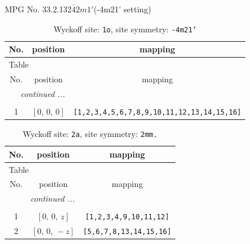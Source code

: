 \documentclass[fleqn,8pt]{jsarticle}
\begin{document}
\setcounter{MaxMatrixCols}{32}

\renewcommand{\tablename}{Table~}
\renewcommand{\figurename}{Figure~}
\begin{center}
\LARGE
MPG No. 33.2.132\quad$\bar{4}2m1'$\quad(-4m21' setting)
\end{center}
\renewcommand{\arraystretch}{1.2}
\begin{longtable}{ccc}
\caption{Wyckoff site: {\tt 1o}, site symmetry: {\tt -4m21'}}
 \\
 \hline \hline
No. & position & mapping \\ \hline \endfirsthead

\multicolumn{2}{l}{\tablename\ \thetable{}} \\
 \hline \hline
No. & position & mapping \\ \hline \endhead

 \hline \hline
\multicolumn{2}{r}{\footnotesize\it continued ...} \\ \endfoot

 \hline \hline
\multicolumn{2}{r}{} \\ \endlastfoot

1 & $\left[ 0,\, 0,\, 0 \right]$ & {\tt [1,2,3,4,5,6,7,8,9,10,11,12,13,14,15,16]} \\
\end{longtable}
\renewcommand{\arraystretch}{1.2}
\begin{longtable}{ccc}
\caption{Wyckoff site: {\tt 2a}, site symmetry: {\tt 2mm.}}
 \\
 \hline \hline
No. & position & mapping \\ \hline \endfirsthead

\multicolumn{2}{l}{\tablename\ \thetable{}} \\
 \hline \hline
No. & position & mapping \\ \hline \endhead

 \hline \hline
\multicolumn{2}{r}{\footnotesize\it continued ...} \\ \endfoot

 \hline \hline
\multicolumn{2}{r}{} \\ \endlastfoot

1 & $\left[ 0,\, 0,\, z \right]$ & {\tt [1,2,3,4,9,10,11,12]} \\ \hline
2 & $\left[ 0,\, 0,\, - z \right]$ & {\tt [5,6,7,8,13,14,15,16]} \\
\end{longtable}
\renewcommand{\arraystretch}{1.2}
\end{document}
